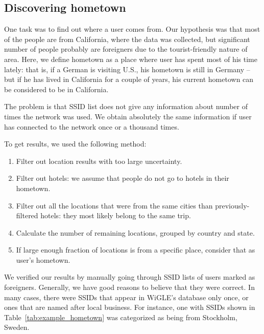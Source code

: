\documentclass[12pt,a4paper,oneside,pdftex]{report}
\begin{document}
\subsection{Discovering hometown}
\label{sec:practical_geolocation}

One task was to find out where a user comes from. Our hypothesis was that most of the people are from California, where the data was collected, but significant number of people probably are foreigners due to the tourist-friendly nature of area. Here, we define hometown as a place where user has spent most of his time lately: that is, if a German is visiting U.S., his hometown is still in Germany -- but if he has lived in California for a couple of years, his current hometown can be considered to be in California.

The problem is that SSID list does not give any information about number of times the network was used. We obtain absolutely the same information if user has connected to the network once or a thousand times.

To get results, we used the following method:
\begin{enumerate}
    \item Filter out location results with too large uncertainty.
    \item Filter out hotels: we assume that people do not go to hotels in their hometown.
    \item Filter out all the locations that were from the same cities than previously-filtered hotels: they most likely belong to the same trip.
    \item Calculate the number of remaining locations, grouped by country and state.
    \item If large enough fraction of locations is from a specific place, consider that as user's hometown.
\end{enumerate}

We verified our results by manually going through SSID lists of users marked as foreigners. Generally, we have good reasons to believe that they were correct. In many cases, there were SSIDs that appear in WiGLE's database only once, or ones that are named after local business. For instance, one with SSIDs shown in Table~\ref{tab:example_hometown} was categorized as being from Stockholm, Sweden.
\end{document}
